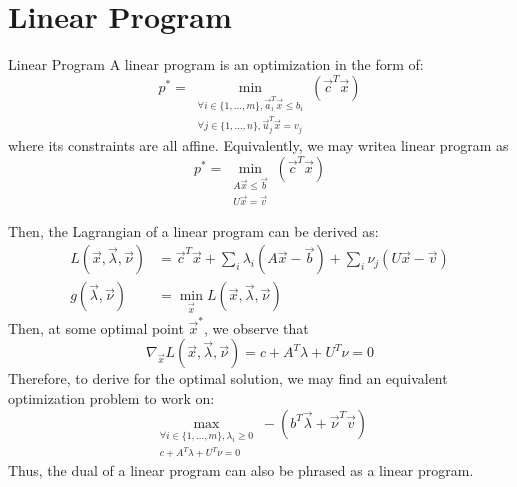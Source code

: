 \section{Linear Program}
\begin{ln-define}{Linear Program}{}
    A linear program is an optimization in the form of:
    \[
        p^* = \min_{
            \substack{
                \forall i \in \{1, \dots, m\}, \vec{a}_i^T \vec{x} \leq b_i \\
                \forall j \in \{1, \dots, n\}, \vec{u}_j^T \vec{x} = v_j
            }
        } (\vec{c}^T \vec{x})
    \]
    where its constraints are all affine.
    Equivalently, we may writea linear program as
    \[
        p^* = \min_{
            \substack{
                A \vec{x} \leq \vec{b} \\
                U \vec{x} = \vec{v}
            }
        } (\vec{c}^T \vec{x})
    \]
\end{ln-define}
Then, the Lagrangian of a linear program can be derived as:
\begin{align*}
    L(\vec{x}, \vec{\lambda}, \vec{\nu}) &= \vec{c}^T \vec{x} + \sum_i \lambda_i (A \vec{x} - \vec{b}) + \sum_i \nu_j (U \vec{x} - \vec{v}) \\
    g(\vec{\lambda}, \vec{\nu}) &= \min_{\vec{x}} L(\vec{x}, \vec{\lambda}, \vec{\nu})
\end{align*}
Then, at some optimal point $\vec{x}^*$, we observe that
\[
    \nabla_{\vec{x}} L(\vec{x}, \vec{\lambda}, \vec{\nu}) = c + A^T \lambda + U^T \nu = 0
\]
Therefore, to derive for the optimal solution, we may find an equivalent optimization problem to work on:
\[
    \max_{
        \substack{
            \forall i \in \{1, \dots, m\}, \lambda_i \geq 0 \\
            c + A^T \lambda + U^T \nu = 0
        }
    } -(b^T \vec{\lambda} + \vec{\nu}^T \vec{v})
\]
Thus, the dual of a linear program can also be phrased as a linear program.
